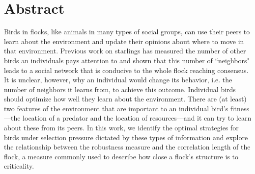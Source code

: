 \documentclass{article}
\begin{document}
%

\tableofcontents

\section{Abstract}
Birds in flocks, like animals in many types of social groups, can use their peers to learn about the environment and update their opinions about where to move in that environment.  Previous work on starlings has measured the number of other birds an individuals pays attention to and shown that this number of ``neighbors" leads to a social network that is conducive to the whole flock reaching consensus.  It is unclear, however, why an individual would change its behavior, i.e. the number of neighbors it learns from, to achieve this outcome.  Individual birds should optimize how well they learn about the environment. There are (at least) two features of the environment that are important to an individual bird's fitness---the location of a predator and the location of resources---and it can try to learn about these from its peers. In this work, we identify the optimal strategies for birds under selection pressure dictated by these types of information and explore the relationship between the robustness measure and the correlation length of the flock, a measure commonly used to describe how close a flock's structure is to criticality.
\end{document}
